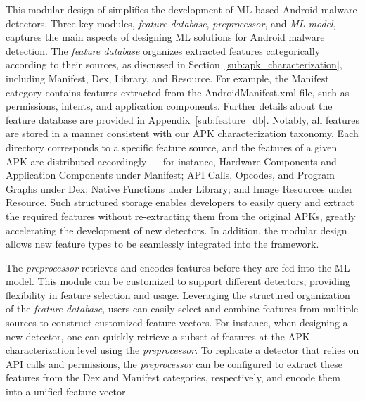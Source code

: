 This modular design of \codename simplifies the development of ML-based Android malware detectors. Three key modules, \textit{feature database}, \textit{preprocessor}, and \textit{ML model}, captures the main aspects of designing ML solutions for Android malware detection.
The \textit{feature database} organizes extracted features categorically according to their sources, as discussed in Section~\ref{sub:apk_characterization}, including Manifest, Dex, Library, and Resource. 
For example, the Manifest category contains features extracted from the AndroidManifest.xml file, such as permissions, intents, and application components.
Further details about the feature database are provided in Appendix~\ref{sub:feature_db}.
Notably, all features are stored in a manner consistent with our APK characterization taxonomy.
Each directory corresponds to a specific feature source, and the features of a given APK are distributed accordingly --- for instance, Hardware Components and Application Components under Manifest; API Calls, Opcodes, and Program Graphs under Dex; Native Functions under Library; and Image Resources under Resource.
Such structured storage enables developers to easily query and extract the required features without re-extracting them from the original APKs, greatly accelerating the development of new detectors.
In addition, the modular design allows new feature types to be seamlessly integrated into the framework.

The \textit{preprocessor} retrieves and encodes features before they are fed into the ML model.
This module can be customized to support different detectors, providing flexibility in feature selection and usage.
Leveraging the structured organization of the \textit{feature database}, users can easily select and combine features from multiple sources to construct customized feature vectors.
For instance, when designing a new detector, one can quickly retrieve a subset of features at the APK-characterization level using the \textit{preprocessor}.
To replicate a detector that relies on API calls and permissions, the \textit{preprocessor} can be configured to extract these features from the Dex and Manifest categories, respectively, and encode them into a unified feature vector.

